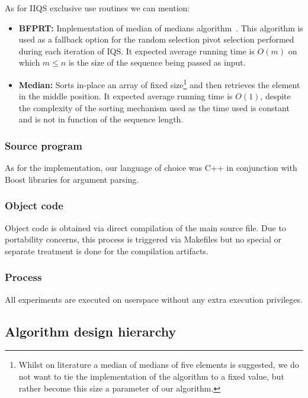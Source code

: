 As for IIQS exclusive use routines we can mention:
\begin{itemize}
    \item \textbf{BFPRT:} Implementation of median of medians algorithm~\cite{Blum_Floyd_Pratt_Rivest_Tarjan_1973}. This algorithm is used as a fallback option for the random selection pivot selection performed during each iteration of IQS. It expected average running time is $O(m)$ on which $m \leq n$ is the size of the sequence being passed as input.
    \item \textbf{Median:} Sorts in-place an array of fixed size\footnote{Whilst on literature a median of medians of five elements is suggested, we do not want to tie the implementation of the algorithm to a fixed value, but rather become this size a parameter of our algorithm.} and then retrieves the element in the middle position. It expected average running time is $O(1)$, despite the complexity of the sorting mechanism used as the time used is constant and is not in function of the sequence length.
\end{itemize}

\subsubsection{Source program}
As for the implementation, our language of choice was C++ in conjunction with Boost libraries for argument parsing. \\

\subsubsection{Object code}
Object code is obtained via direct compilation of the main source file. Due to portability concerns, this process is triggered via Makefiles but no special or separate treatment is done for the compilation artifacts.\\

\subsubsection{Process}
All experiments are executed on userspace without any extra execution privileges.\\

\subsection{Algorithm design hierarchy}


